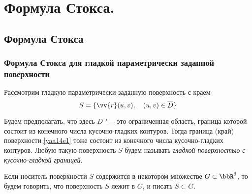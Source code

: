 \chapter{Формула Стокса.}
\section{Формула Стокса}
\subsection{Формула Стокса для гладкой параметрически заданной поверхности}
Рассмотрим гладкую параметрически заданную поверхность с краем
\begin{equation} \label{yaa14e1}
S=\{\vv{r}(u,v),\quad(u,v)\in\overline{D} \}
\end{equation}

Будем предполагать, что здесь $D$ "--- это ограниченная область, граница которой состоит из конечного числа кусочно-гладких контуров. Тогда граница (край) поверхности \eqref{yaa14e1} тоже состоит из конечного числа кусочно-гладких контуров. Любую такую поверхность $S$ будем называть \textit{гладкой поверхностью с кусочно-гладкой границей}.

Если носитель поверхности $S$ содержится в некотором множестве $G\subset \bbR^3$, то будем говорить, что поверхность $S$ лежит в $G$, и писать $S\subset G$.

